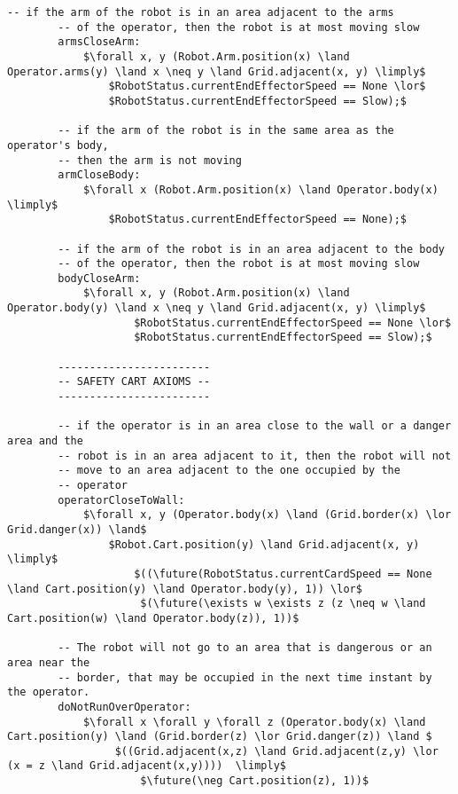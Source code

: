 \begin{lstlisting}[fontadjust, mathescape, frame=single]
        -- if the arm of the robot is in an area adjacent to the arms
        -- of the operator, then the robot is at most moving slow
        armsCloseArm:
            $\forall x, y (Robot.Arm.position(x) \land Operator.arms(y) \land x \neq y \land Grid.adjacent(x, y) \limply$
                $RobotStatus.currentEndEffectorSpeed == None \lor$
                $RobotStatus.currentEndEffectorSpeed == Slow);$

        -- if the arm of the robot is in the same area as the operator's body,
        -- then the arm is not moving
        armCloseBody:
            $\forall x (Robot.Arm.position(x) \land Operator.body(x) \limply$
                $RobotStatus.currentEndEffectorSpeed == None);$

        -- if the arm of the robot is in an area adjacent to the body
        -- of the operator, then the robot is at most moving slow
        bodyCloseArm:
            $\forall x, y (Robot.Arm.position(x) \land Operator.body(y) \land x \neq y \land Grid.adjacent(x, y) \limply$
                    $RobotStatus.currentEndEffectorSpeed == None \lor$
                    $RobotStatus.currentEndEffectorSpeed == Slow);$

        ------------------------       
        -- SAFETY CART AXIOMS --
        ------------------------

        -- if the operator is in an area close to the wall or a danger area and the
        -- robot is in an area adjacent to it, then the robot will not
        -- move to an area adjacent to the one occupied by the
        -- operator
        operatorCloseToWall:
            $\forall x, y (Operator.body(x) \land (Grid.border(x) \lor Grid.danger(x)) \land$
                $Robot.Cart.position(y) \land Grid.adjacent(x, y) \limply$
                    $((\future(RobotStatus.currentCardSpeed == None \land Cart.position(y) \land Operator.body(y), 1)) \lor$
                     $(\future(\exists w \exists z (z \neq w \land Cart.position(w) \land Operator.body(z)), 1))$    

        -- The robot will not go to an area that is dangerous or an area near the 
        -- border, that may be occupied in the next time instant by the operator.
        doNotRunOverOperator:
            $\forall x \forall y \forall z (Operator.body(x) \land Cart.position(y) \land (Grid.border(z) \lor Grid.danger(z)) \land $
                 $((Grid.adjacent(x,z) \land Grid.adjacent(z,y) \lor (x = z \land Grid.adjacent(x,y))))  \limply$
                     $\future(\neg Cart.position(z), 1))$


\end{lstlisting}
